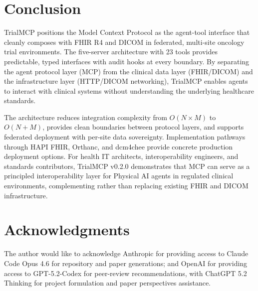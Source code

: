 \documentclass[10pt,letterpaper]{article}
\begin{document}
\section{Conclusion}

TrialMCP positions the Model Context Protocol as the agent-tool interface that cleanly composes with FHIR R4 and DICOM in federated, multi-site oncology trial environments. The five-server architecture with 23 tools provides predictable, typed interfaces with audit hooks at every boundary. By separating the agent protocol layer (MCP) from the clinical data layer (FHIR/DICOM) and the infrastructure layer (HTTP/DICOM networking), TrialMCP enables agents to interact with clinical systems without understanding the underlying healthcare standards.

The architecture reduces integration complexity from $O(N \times M)$ to $O(N + M)$, provides clean boundaries between protocol layers, and supports federated deployment with per-site data sovereignty. Implementation pathways through HAPI FHIR, Orthanc, and dcm4chee provide concrete production deployment options. For health IT architects, interoperability engineers, and standards contributors, TrialMCP v0.2.0 demonstrates that MCP can serve as a principled interoperability layer for Physical AI agents in regulated clinical environments, complementing rather than replacing existing FHIR and DICOM infrastructure.




\section*{Acknowledgments}

The author would like to acknowledge Anthropic for providing access to Claude Code Opus 4.6 for repository and paper generations; and OpenAI for providing access to GPT-5.2-Codex for peer-review recommendations, with ChatGPT 5.2 Thinking for project formulation and paper perspectives assistance.
\end{document}
